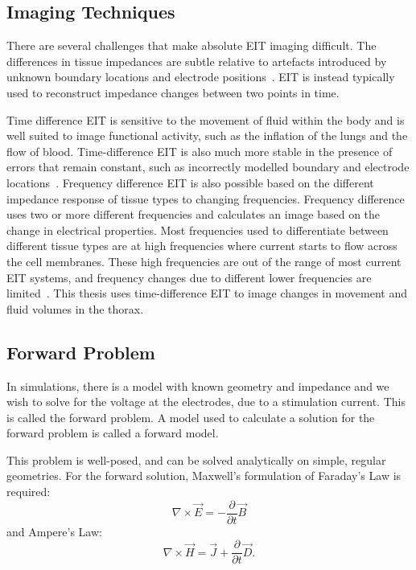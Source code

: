 \subsection{Imaging Techniques}
There are several challenges that make absolute EIT imaging difficult. 
The differences in tissue impedances are subtle relative to artefacts introduced 
by unknown boundary locations and electrode 
positions~\parencite{adler_why_2015,adler_electrical_2017,nissinen_compensation_2009}. 
EIT is instead typically used to reconstruct impedance changes between two points in time.

Time difference EIT is sensitive to the movement of fluid within the body 
and is well suited to image functional activity, such as 
the inflation of the lungs 
and the flow of blood.
Time-difference EIT is also much more stable in the presence of errors that remain 
constant, such as incorrectly modelled boundary and electrode 
locations~\parencite{brown_electrical_2003}.
Frequency difference EIT is also possible based on the different impedance response 
of tissue types to changing frequencies. Frequency difference uses 
two or more different frequencies and calculates an image based on the change in electrical properties.
Most frequencies used to differentiate between different tissue types are at high frequencies 
where current starts to flow across the cell membranes. 
These high frequencies are out of the range of most current EIT systems, and 
frequency changes due to different lower frequencies are limited~\parencite{adler_electrical_2017}.
This thesis uses time-difference EIT to image changes in movement and fluid volumes in the thorax.

\subsection{Forward Problem} \label{sec:fwd}
In simulations, there is a model with known geometry and impedance and we wish to solve for the 
voltage at the electrodes, due to a stimulation current. 
This is called the forward problem. 
A model used to calculate a solution for the forward problem is called a forward 
model. 

This problem is well-posed, and can be solved analytically on simple, regular geometries. 
For the forward solution, Maxwell's formulation of Faraday's Law is required:
\begin{equation} \label{eq:farad}
\nabla \times \vec{E} = -\frac{\partial}{\partial t} \vec{B}
\end{equation}
and Ampere's Law: 
\begin{equation} \label{eq:amp}
\nabla \times \vec{H} = \vec{J} + \frac{\partial}{\partial t} \vec{D}.
\end{equation}

